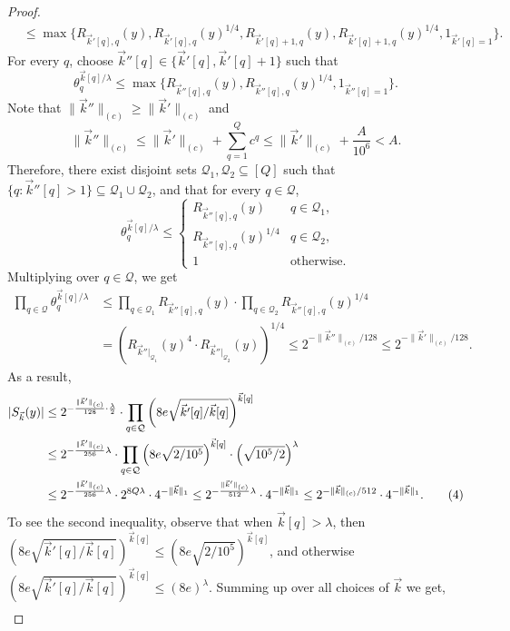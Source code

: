 \documentclass[10pt,a4paper]{article}
\begin{document}
\begin{proof}
\begin{align*}
&\le\max\{R_{\vec k'[q],q}(y),R_{\vec k'[q],q}(y)^{1/4},R_{\vec k'[q]+1,q}(y),R_{\vec k'[q]+1,q}(y)^{1/4},1_{\vec k'[q]=1}\}.
\end{align*}
For every $q$, choose $\vec k''[q]\in\{\vec k'[q],\vec k'[q]+1\}$ such that
\[
\theta_q^{\vec k[q]/\lambda}\le\max\{R_{\vec k''[q],q}(y),R_{\vec k''[q],q}(y)^{1/4},1_{\vec k''[q]=1}\}.
\]
Note that $\|\vec k''\|_{(c)}\ge\|\vec k'\|_{(c)}$ and
\[
\|\vec k''\|_{(c)}\le\|\vec k'\|_{(c)}+\sum_{q=1}^Qc^q\le\|\vec k'\|_{(c)}+\frac A{10^6}<A.
\]
Therefore, there exist disjoint sets $\mathcal Q_1,\mathcal Q_2\subseteq[Q]$ such that $\{q:\vec k''[q]>1\}\subseteq\mathcal Q_1\cup\mathcal Q_2$, and that for every $q\in\mathcal Q$,
\[
\theta_q^{\vec k[q]/\lambda}\le
\begin{cases}R_{\vec k''[q],q}(y)&q\in\mathcal Q_1,\\R_{\vec k''[q],q}(y)^{1/4}&q\in\mathcal Q_2,\\1&\text{otherwise}.\end{cases}
\]
Multiplying over $q\in\mathcal Q$, we get
\begin{align*}
\prod_{q\in\mathcal Q}\theta_q^{\vec k[q]/\lambda}
&\le\prod_{q\in\mathcal Q_1}R_{\vec k''[q],q}(y)\cdot\prod_{q\in\mathcal Q_2}R_{\vec k''[q],q}(y)^{1/4}\\
&=\left(R_{\vec k''|_{\mathcal Q_1}}(y)^4\cdot R_{\vec k''|_{\mathcal Q_2}}(y)\right)^{1/4}
\le2^{-\|\vec k''\|_{(c)}/128}\le2^{-\|\vec k'\|_{(c)}/128}.
\end{align*}
As a result,
\begin{align}
|S_{\vec k}(y)|
&\le2^{-\frac{\|\vec k'\|_{(c)}}{128}\cdot\frac\lambda2}
\cdot\prod_{q\in\mathcal Q}\left(8e\sqrt{\vec k'[q]/\vec k[q]}\right)^{\vec k[q]}\notag\\
&\le2^{-\frac{\|\vec k'\|_{(c)}}{256}\lambda}\cdot
\prod_{q\in\mathcal Q}\left(8e\sqrt{2/10^5}\right)^{\vec k[q]}\cdot\left(\sqrt{10^5/2}\right)^\lambda\notag\\
&\le2^{-\frac{\|\vec k'\|_{(c)}}{256}\lambda}\cdot2^{8Q\lambda}\cdot4^{-\|\vec k\|_1}
\le2^{-\frac{\|\vec k'\|_{(c)}}{512}\lambda}\cdot4^{-\|\vec k\|_1}
\le2^{-\|\vec k\|_{(c)}/512}\cdot4^{-\|\vec k\|_1}.\tag{4}
\end{align}
To see the second inequality, observe that when $\vec k[q]>\lambda$, then
$\left(8e\sqrt{\vec k'[q]/\vec k[q]}\right)^{\vec k[q]}
\le(8e\sqrt{2/10^5})^{\vec k[q]}$, and otherwise
$\left(8e\sqrt{\vec k'[q]/\vec k[q]}\right)^{\vec k[q]}\le(8e)^\lambda$.
Summing up over all choices of $\vec k$ we get,
\begin{align*}

\end{align*}
\end{proof}
\end{document}
